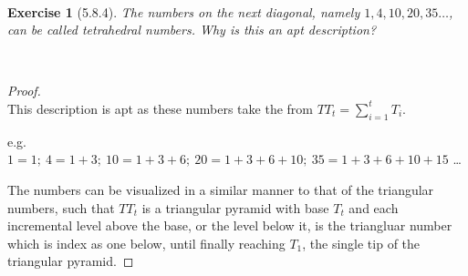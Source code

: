 \documentclass[12pt]{article}
\newcommand{\XB}{\color{black}}
\newcommand{\XBB}{\color{blue}}
\newcommand{\ds}{\displaystyle}
\theoremstyle{plain}
\newtheorem{ex}{Exercise}
\begin{document}
\newpage


\XBB\hrulefill\XB \\
\begin{ex} [5.8.4]
  The numbers on the next diagonal, namely $ 1, 4, 10, 20, 35 \ldots $, can be called \emph{tetrahedral numbers}. Why is this an apt description?
\end{ex}
\XBB\hrulefill\XB \\

\begin{proof}
  \ \\

  This description is apt as these numbers take the from $ \ds TT_{t} = \sum_{i = 1}^{t} T_{i} $.

  e.g. $ 1 = 1; \ 4 = 1 + 3; \ 10 = 1 + 3 + 6; \ 20 = 1 + 3 + 6 + 10; \ 35 = 1 + 3 + 6 + 10 + 15 $ \dots

  The numbers can be visualized in a similar manner to that of the triangular numbers, 
  such that $ TT_{t} $ is a triangular pyramid with base $ T_{t} $ and each incremental level above the base, 
  or the level below it, is the triangluar number which is index as one below, until finally reaching $ T_{1} $, 
  the single tip of the triangular pyramid.

\end{proof}

\newpage
\end{document}
